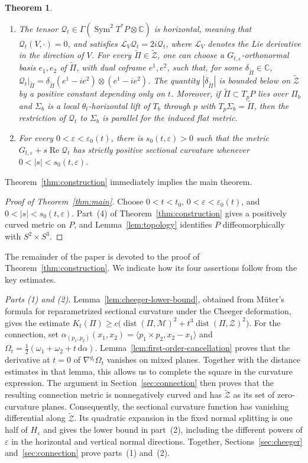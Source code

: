 \documentclass[11pt]{article}
\newtheorem{theorem}{Theorem}[section]
\theoremstyle{definition}
\theoremstyle{remark}
\newcommand{\cM}{\mathcal M}
\newcommand{\cZ}{\mathcal Z}
\newcommand{\tZ}{\widetilde{\mathcal Z}}
\newcommand{\dist}{\operatorname{dist}}
\newcommand{\Lie}{\mathcal L}
\newcommand{\dd}{\mathrm d}
\newcommand{\eps}{\varepsilon}
\begin{document}
\begin{theorem}
\begin{enumerate}
\item The tensor
$\mathcal Q_t\in\Gamma(\operatorname{Sym}^2T^*P\otimes\mathbb C)$ is
horizontal, meaning that $\mathcal Q_t(V,\cdot)=0$, and satisfies
$\Lie_V\mathcal Q_t=2i\mathcal Q_t$, where $\Lie_V$ denotes the Lie derivative
in the direction of $V$.  For every $\widetilde\Pi\in\tZ$, one can choose a
$G_{t,\eps}$-orthonormal basis $e_1,e_2$ of $\widetilde\Pi$, with dual
coframe $e^1,e^2$, such that, for some
$\delta_{\widetilde\Pi}\in\mathbb C$,
$\mathcal Q_t|_{\widetilde\Pi}
=\delta_{\widetilde\Pi}(e^1-ie^2)\otimes(e^1-ie^2)$.
The quantity $|\delta_{\widetilde\Pi}|$ is bounded below on $\tZ$ by a
positive constant depending only on $t$.
Moreover, if $\widetilde\Pi\subset T_pP$ lies over $\Pi_b$ and
$\Sigma_b$ is a local $\theta_t$-horizontal lift of $T_b$ through $p$ with
$T_p\Sigma_b=\widetilde\Pi$, then the restriction of $\mathcal Q_t$ to
$\Sigma_b$ is parallel for the induced flat metric.

\item For every $0<\eps<\eps_0(t)$, there is
$s_0(t,\eps)>0$ such that the metric
$G_{t,\eps}+s\operatorname{Re}\mathcal Q_t$ has strictly positive
sectional curvature whenever $0<|s|<s_0(t,\eps)$.
\end{enumerate}
\end{theorem}

Theorem~\ref{thm:construction} immediately implies the main theorem.
\begin{proof}[Proof of Theorem~\ref{thm:main}]
Choose $0<t<t_0$, $0<\eps<\eps_0(t)$, and
$0<|s|<s_0(t,\eps)$.  Part~(4) of
Theorem~\ref{thm:construction} gives a positively curved metric on $P$, and
Lemma~\ref{lem:topology} identifies $P$ diffeomorphically with
$S^2\times S^3$.
\end{proof}


The remainder of the paper is devoted to the proof of
Theorem~\ref{thm:construction}.  We indicate how its four assertions follow
from the key estimates.

\noindent\emph{Parts (1) and (2).}
Lemma~\ref{lem:cheeger-lower-bound}, obtained from M\"uter's formula for
reparametrized sectional curvature under the Cheeger deformation, gives
the estimate
$K_t(\Pi)\geq
c\bigl(\dist(\Pi,\cM)^2+t^3\dist(\Pi,\cZ)^2\bigr)$.
For the connection, set $\alpha_{(p_1,p_2)}(x_1,x_2)
=\langle p_1\times p_2,x_2-x_1\rangle$ and
$\Omega_t=\tfrac12(\omega_1+\omega_2+t\,\dd\alpha)$.
Lemma~\ref{lem:first-order-cancellation} proves that the derivative at $t=0$
of $\nabla^{g_t}\Omega_t$ vanishes on mixed planes.  Together with the
distance estimates in that lemma, this allows us to complete the square in
the curvature expression.
The argument in Section~\ref{sec:connection} then proves that the resulting
connection metric is nonnegatively curved and has $\tZ$ as its set of
zero-curvature planes.  Consequently, the sectional curvature function has
vanishing differential along $\tZ$.  Its quadratic expansion in the fixed
normal splitting is one half of $H_\eps$ and gives the lower bound in
part~(2), including the different powers of $\eps$ in the horizontal and
vertical normal directions.  Together,
Sections~\ref{sec:cheeger} and~\ref{sec:connection} prove parts~(1) and~(2).
\end{document}
